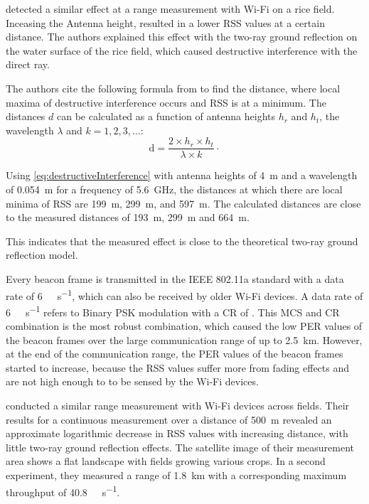 \textcite{brinkhoff_characterization_2017} detected a similar effect at a range measurement with Wi-Fi on a rice field.
Inceasing the Antenna height,
resulted in a lower \ac{RSS} values at a certain distance.
The authors explained this effect with the two-ray ground reflection on the water surface of the rice field,
which caused destructive interference with the direct ray.

The authors cite the following formula from \cite{rappaport_wireless_nodate} to find the distance, where local maxima
of destructive interference occurs and \ac{RSS} is at a minimum.
The distances $d$ can be calculated as a function of antenna heights
$h_r$ and $h_t$, the wavelength $\lambda$ and $k = 1, 2, 3, \dots$:
\begin{equation}\label{eq:destructiveInterference}
   \text{d} =
   \frac{
      2 \times h_r \times h_t
   }{
      \lambda \times k
   }
   \cdot
\end{equation}

Using \autoref{eq:destructiveInterference} with antenna heights of \SI{4}{\metre} and a wavelength of \SI{0.054}{\metre} for a frequency of \SI{5.6}{\giga\hertz},
the distances at which there are local minima of \ac{RSS} are \SI{199}{\metre}, \SI{299}{\metre}, and \SI{597}{\metre}.
The calculated distances are close to the measured distances of \SI{193}{\metre}, \SI{299}{\metre} and \SI{664}{\metre}.

This indicates that the measured effect is close to the theoretical two-ray ground reflection model.

Every beacon frame is transmitted in the IEEE 802.11a standard with a data rate of \SI{6}{\mega\bit\per\second}, which can also be received
by older Wi-Fi devices.
A data rate of \SI{6}{\mega\bit\per\second} refers to Binary \ac{PSK} modulation with a \ac{CR} of  \cite{ieee_standard_1999}.
This \ac{MCS} and \ac{CR} combination is the most robust combination, which caused the low \ac{PER} values of the beacon frames over
the large communication range of up to \SI{2.5}{\kilo\metre}.
However, at the end of the communication range, the \ac{PER} values of the beacon frames
started to increase, because the \ac{RSS} values suffer more from fading effects and are not high enough to
to be sensed by the Wi-Fi devices.

\textcite{paul_characterizing_2011} conducted a similar range measurement with Wi-Fi devices across fields. Their
results for a continuous measurement over a distance of \SI{500}{\metre} revealed an approximate logarithmic decrease
in \ac{RSS} values with increasing distance, with little two-ray ground reflection effects.
The satellite image of their measurement area shows a flat landscape with fields growing various crops.
In a second experiment, they measured a range of \SI{1. 8}{\kilo\metre} with a corresponding maximum throughput of
\SI{40.8}{\mega\bit\per\second}.

